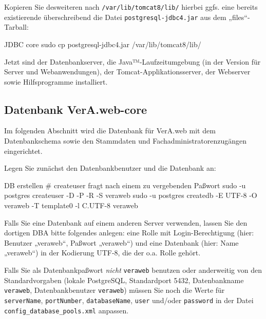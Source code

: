 \documentclass{tarentanleitung}
\begin{document}
\begin{minipage}{\linewidth}
Kopieren Sie desweiteren nach \texttt{/var/lib/tomcat8/lib/} \dash
hierbei ggfs. eine bereits existierende überschreibend \dash die
Datei \texttt{postgresql-jdbc4.jar} aus dem „files“-Tarball:

\begin{lstdump}{JDBC core}
sudo cp postgresql-jdbc4.jar /var/lib/tomcat8/lib/
\end{lstdump}
\end{minipage}

Jetzt sind der Datenbankserver, die Java™-Laufzeitumgebung (in der
Version für Server und Webanwendungen), der Tomcat-Applikationsserver,
der Webserver sowie Hilfsprogramme installiert.

\subsection{Datenbank VerA.web-core}\label{subsec:setup-core-db}

Im folgenden Abschnitt wird die Datenbank für VerA.web mit dem
Datenbankschema sowie den Stammdaten und Fachadministratorenzugängen
eingerichtet.

\begin{minipage}{\linewidth}
Legen Sie zunächst den Datenbankbenutzer und die Datenbank an:

\begin{lstdump}{DB erstellen}
# createuser fragt nach einem zu vergebenden Paßwort
sudo -u postgres createuser -D -P -R -S veraweb
sudo -u postgres createdb -E UTF-8 -O veraweb -T template0 -l C.UTF-8 veraweb
\end{lstdump}
\end{minipage}

Falls Sie eine Datenbank auf einem anderen Server verwenden, lassen
Sie den dortigen DBA bitte folgendes anlegen: eine Rolle mit
Login-Berechtigung (hier: Benutzer „veraweb“, Paßwort „veraweb“)
und eine Datenbank (hier: Name „veraweb“) in der Kodierung UTF-8,
die der o.a. Rolle gehört.

Falls Sie als Datenbankpaßwort \emph{nicht} \texttt{veraweb} benutzen oder
anderweitig von den Standardvorgaben (lokale PostgreSQL, Standardport 5432,
Datenbankname \texttt{veraweb}, Datenbankbenutzer \texttt{veraweb}) müssen
Sie noch die Werte für \texttt{serverName}, \texttt{portNumber},
\texttt{databaseName}, \texttt{user} und/oder \texttt{password} in der
Datei \texttt{config\_database\_pools.xml} anpassen.
\end{document}
